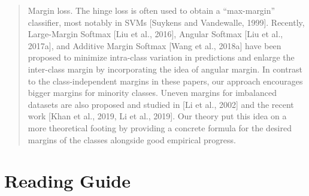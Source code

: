 
\begin{quote}
Margin loss. The hinge loss is often used to obtain a “max-margin” classifier, most notably in
SVMs [Suykens and Vandewalle, 1999]. Recently, Large-Margin Softmax [Liu et al., 2016], Angular
Softmax [Liu et al., 2017a], and Additive Margin Softmax [Wang et al., 2018a] have been proposed
to minimize intra-class variation in predictions and enlarge the inter-class margin by incorporating
the idea of angular margin. In contrast to the class-independent margins in these papers, our approach
encourages bigger margins for minority classes. Uneven margins for imbalanced datasets are also
proposed and studied in [Li et al., 2002] and the recent work [Khan et al., 2019, Li et al., 2019]. Our
theory put this idea on a more theoretical footing by providing a concrete formula for the desired
margins of the classes alongside good empirical progress. \cite{cao2019learningimbalanceddatasetslabeldistributionaware}
\end{quote}


\section{Reading Guide}

